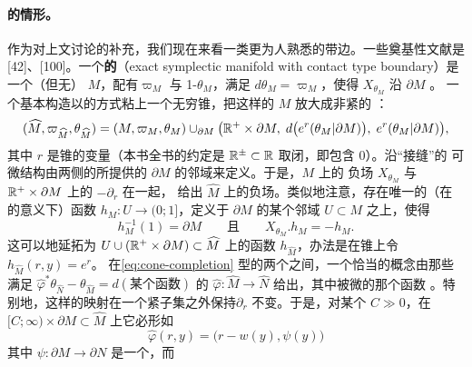 \paragraph{\trContactTypeBoundary{}的情形。}\label{sub:contact-type-boundary}
作为对上文讨论的补充，我们现在来看一类更为人熟悉的带边\trSymplectic\trManifold。一些奠基性文献是
[42]、[100]。一个\textbf{\trContactTypeBoundary{}的\trExactSymplectic\trManifold}（exact symplectic
manifold with contact type boundary）是一个\trCompact\trManifoldWithBoundary（但无\trCornerPoint）%
$M$，配有\trSymplecticForm{}$\varpi_M$ 与 1-\trForm{}$\theta_M$，满足 $d\theta_M=\varpi_M$，使得%
$X_{\theta_M}$ 沿 $\partial M$ \trIncoming。
一个基本构造以\trCanonical{}的方式粘上一个无穷锥，把这样的 $M$ 放大成非紧的%
\trExactSymplectic\trManifold：
\begin{equation}\label{eq:cone-completion}
(\widehat{M},\varpi_{\widehat{M}},\theta_{\widehat{M}})
=(M,\varpi_M,\theta_M)\cup_{\partial M}
\bigl(\mathbb{R}^+\times\partial M,\;d\bigl(e^r(\theta_M|\partial M)\bigr),\;e^r(\theta_M|\partial M)\bigr),
\end{equation}
其中 $r$ 是锥的\trRadial{}变量（本书全书的约定是 $\mathbb{R}^\pm\subset\mathbb{R}$ 取闭，即包含 $0$）。沿“接缝”的%
可微结构由两侧的\trLiouville\trFlow{}所提供的 $\partial M$ 的\trCollar{}邻域来定义。于是，$M$ 上的%
负\trLiouville{}场 $X_{\theta_M}$ 与 $\mathbb{R}^+\times\partial M$ 上的 $-\partial_r$ \trGluing{}在一起，
给出 $\widehat{M}$ 上的负\trLiouville{}场。类似地注意，存在唯一的（在\trGerm{}的意义下）函数%
$h_M\colon U\to(0;1]$，定义于 $\partial M$ 的某个邻域 $U\subset M$ 之上，使得
\begin{equation}\label{eq:contact-gluing-function}
h_M^{-1}(1)=\partial M \qquad\text{且}\qquad X_{\theta_M}.h_M=-h_M.
\end{equation}
这可以\trSmooth{}地延拓为 $U\cup(\mathbb{R}^+\times\partial M)\subset\widehat{M}$ 上的函数%
$h_{\widehat{M}}$，办法是在锥上令 $h_{\widehat{M}}(r,y)=e^r$。
在\eqref{eq:cone-completion} 型的两个\trManifold{}之间，一个恰当的\trIsomorphism{}概念由那些满足%
$\widehat{\varphi}^*\theta_{\widehat{N}}-\theta_{\widehat{M}}=d(\text{某个函数})$ 的%
\trDiffeomorphism{}$\widehat{\varphi}\colon\widehat{M}\to\widehat{N}$ 给出，其中被微的那个函数%
\trCompactlySupported。特别地，这样的映射在一个紧子集之外保持\trLiouville\trVectorField{}$\partial_r$
不变。于是，对某个 $C\gg 0$，在%
$[C;\infty)\times\partial M\subset\widehat{M}$ 上它必形如
\begin{equation*}
\widehat{\varphi}(r,y)=\bigl(r-w(y),\psi(y)\bigr)
\end{equation*}
其中 $\psi\colon\partial M\to\partial N$ 是一个\trContact\trDiffeomorphism，而
